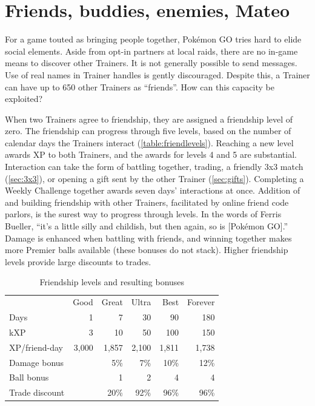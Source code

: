 \chapter{Friends, buddies, enemies, Mateo\label{chap:friends}}
For a game touted as bringing people together, Pokémon GO tries hard to elide social elements.
Aside from opt-in partners at local raids, there are no in-game means to discover other Trainers.
It is not generally possible to send messages.
Use of real names in Trainer handles is gently discouraged.
Despite this, a Trainer can have up to 650 other Trainers as ``friends''.
How can this capacity be exploited?

When two Trainers agree to friendship, they are assigned a friendship level of zero.
The friendship can progress through five levels, based on the number of calendar
  days the Trainers interact (\autoref{table:friendlevels}).
Reaching a new level awards XP to both Trainers, and the awards for levels 4 and 5 are substantial.
Interaction can take the form of battling together, trading, a friendly 3x3 match (\autoref{sec:3x3}), or
  opening a gift sent by the other Trainer (\autoref{sec:gifts}).
Completing a Weekly Challenge together awards seven days' interactions at once.
Addition of and building friendship with other Trainers, facilitated by online friend code parlors,
  is the surest way to progress through levels.
In the words of Ferris Bueller, ``it's a little silly and childish, but then again, so is [Pokémon GO].''
Damage is enhanced when battling with friends, and winning together
  makes more Premier balls available (these bonuses do not stack).
Higher friendship levels provide large discounts to trades.
\begin{table}
\centering
\begin{tabular}{lrrrrr}
  & Good & Great & Ultra & Best & Forever \\
\Midrule
  Days & 1 & 7 & 30 & 90 & 180\\
  kXP  & 3 & 10 & 50 & 100 & 150 \\
  XP/friend-day & 3,000 & 1,857 & 2,100 & 1,811 & 1,738 \\
  Damage bonus &  & 5\% & 7\% & 10\% & 12\% \\
  Ball bonus &  & 1 & 2 & 4 & 4 \\
  Trade discount &  & 20\% & 92\% & 96\% & 96\% \\
\end{tabular}
  \caption{Friendship levels and resulting bonuses\label{table:friendlevels}}
\end{table}
